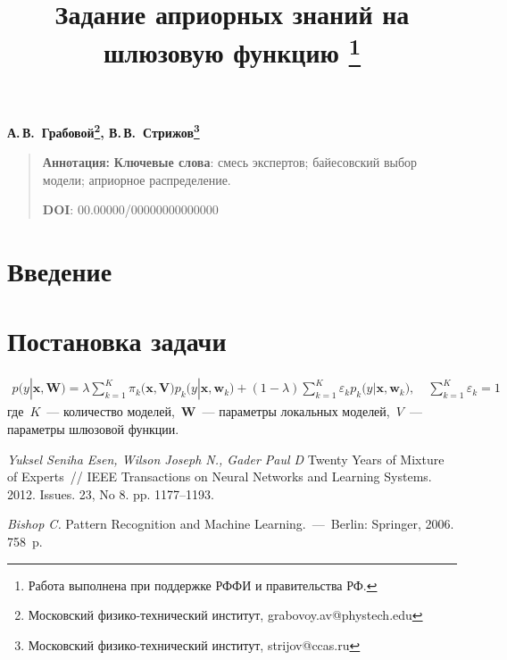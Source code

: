 \documentclass[12pt, twoside]{article}
\numberwithin{equation}{section}
\begin{document}
\title{\bf Задание априорных знаний на шлюзовую функцию \thanks{Работа выполнена при поддержке РФФИ и правительства РФ.}}
\date{}
\author{}
\maketitle

\begin{center}
\bf
А.\,В.~Грабовой\footnote{Московский физико-технический институт, grabovoy.av@phystech.edu}, В.\,В.~Стрижов\footnote{Московский физико-технический институт, strijov@ccas.ru}

\end{center}

{\centering\begin{quote}
\textbf{Аннотация:} 
\smallskip
\textbf{Ключевые слова}: смесь экспертов; байесовский выбор модели; априорное распределение.

\smallskip
\textbf{DOI}: 00.00000/00000000000000
\end{quote}
}

\section{Введение}
\section{Постановка задачи}
\[
\label{eq:st:6}
\begin{aligned}
p\bigr(y|\textbf{x}, \textbf{W}\bigr)=\lambda\sum_{k=1}^{K}\pi_{k}\bigr(\textbf{x}, \textbf{V}\bigr)p_k\bigr(y|\textbf{x}, \textbf{w}_k\bigr)+\left(1-\lambda\right)\sum_{k=1}^{K}\varepsilon_{k}p_k\bigr(y|\textbf{x}, \textbf{w}_k\bigr), \quad \sum_{k=1}^{K}\varepsilon_k=1
\end{aligned}
\]
где~$K$~--- количество моделей,~$\textbf{W}$~--- параметры локальных моделей,~$V$~--- параметры шлюзовой функции.

\begin{thebibliography}{99}
	\textit{Yuksel Seniha Esen, Wilson Joseph N., Gader Paul D} Twenty Years of Mixture of Experts~// IEEE Transactions on Neural Networks and Learning Systems. 2012. Issues. 23, No 8. pp. 1177--1193.
		
	\textit{Bishop C.} Pattern Recognition and Machine Learning.~---~Berlin: Springer, 2006. 758~p.
 \end{thebibliography}
\end{document}
